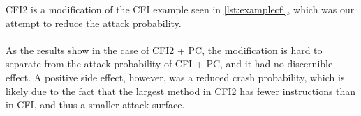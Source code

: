 CFI2 is a modification of the CFI example seen in \cref{lst:examplecfi}, which was our attempt to reduce the attack probability.\\\\
As the results show in the case of CFI2 + PC, the modification is hard to separate from the attack probability of CFI + PC, and it had no discernible effect. A positive side effect, however, was a reduced crash probability, which is likely due to the fact that the largest method in CFI2 has fewer instructions than in CFI, and thus a smaller attack surface.
